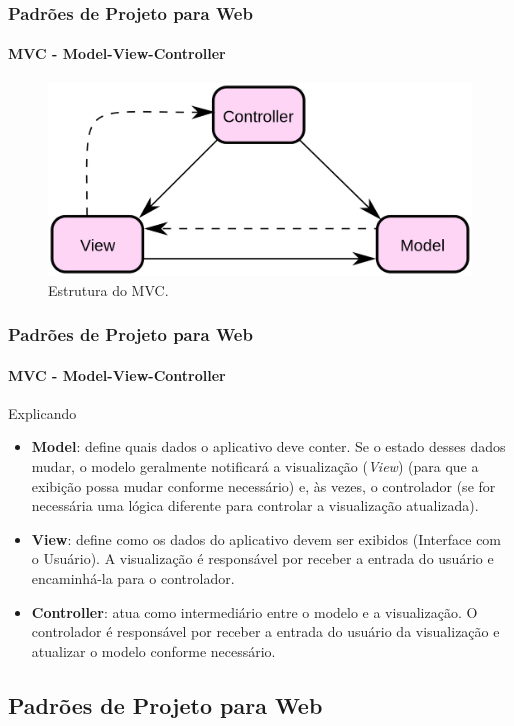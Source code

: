 \documentclass[
	10pt, %
	t, %
]{beamer}
\begin{document}
\begin{frame}
	\frametitle{Padrões de Projeto para Web}
	\framesubtitle{MVC - Model-View-Controller}

	\begin{figure}
		\centering
		\includegraphics[width=0.9\linewidth]{Images/mvc.png}
		\caption{Estrutura do MVC.}\label{fig:mvc}
	\end{figure}

\end{frame}

\begin{frame}
	\frametitle{Padrões de Projeto para Web}
	\framesubtitle{MVC - Model-View-Controller}

	\begin{block}{Explicando}
		\begin{itemize}
			\item \textbf{Model}: define quais dados o aplicativo deve conter. Se o estado desses dados mudar, o modelo geralmente notificará a visualização (\textit{View}) (para que a exibição possa mudar conforme necessário) e, às vezes, o controlador (se for necessária uma lógica diferente para controlar a visualização atualizada).
			\item \textbf{View}: define como os dados do aplicativo devem ser exibidos (Interface com o Usuário). A visualização é responsável por receber a entrada do usuário e encaminhá-la para o controlador.
			\item \textbf{Controller}: atua como intermediário entre o modelo e a visualização. O controlador é responsável por receber a entrada do usuário da visualização e atualizar o modelo conforme necessário. 
		\end{itemize}
	\end{block}

\end{frame}



\subsection{Padrões de Projeto para Web}
\end{document}
